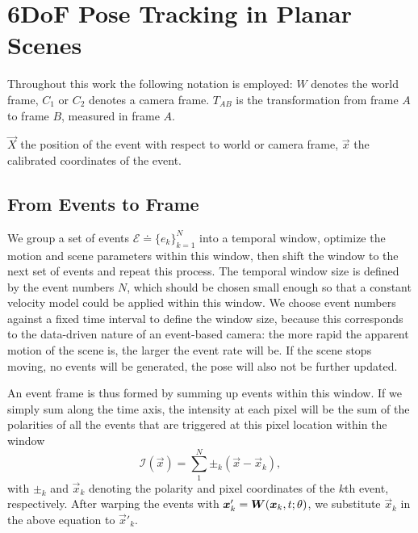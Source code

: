 \chapter{6DoF Pose Tracking in Planar Scenes}
\label{sec:planar_scenes}

Throughout this work the following notation is employed: $W$ denotes
the world frame, $C_1$ or $C_2$ denotes a camera frame.  $T_{AB}$ is
the transformation from frame $A$ to frame $B$, measured in frame $A$.

$\vec{X}$ the position of the event with respect to world or camera
frame, $\vec{x}$ the calibrated coordinates of the event.

\section{From Events to Frame}
\label{sec:event_warp}
We group a set of events $\mathscr{E}\doteq \{e_k\}_{k=1}^N$ into a
temporal window, optimize the motion and scene parameters within this
window, then shift the window to the next set of events and repeat
this process. The temporal window size is defined by the event numbers
$N$, which should be chosen small enough so that a constant velocity
model could be applied within this window. We choose event numbers
against a fixed time interval to define the window size, because this
corresponds to the data-driven nature of an event-based camera: the
more rapid the apparent motion of the scene is, the larger the event
rate will be. If the scene stops moving, no events will be generated,
the pose will also not be further updated.

An event frame is thus formed by summing up events within this
window. If we simply sum along the time axis, the intensity at each
pixel will be the sum of the polarities of all the events that are
triggered at this pixel location within the window
\begin{equation}
  \label{eq:intensity}
  \mathcal{I}(\vec{x}) = \sum_1^N\pm_k(\vec{x}-\vec{x}_k),
\end{equation}
with $\pm_k$ and $\vec{x}_k$ denoting the polarity and pixel
coordinates of the $k$th event, respectively. After warping the events
with $\vec{x}'_k=\mat{W}(\vec{x}_k,t;\theta)$, we substitute
$\vec{x}_k$ in the above equation to $\vec{x}'_k$.

